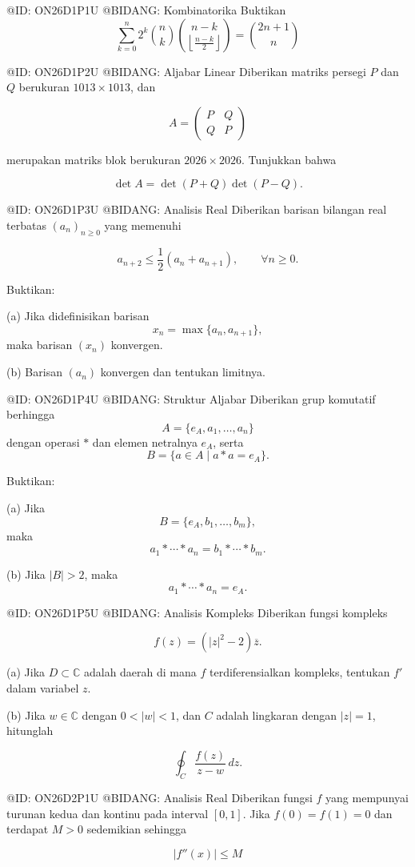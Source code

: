 @ID: ON26D1P1U
@BIDANG: Kombinatorika
Buktikan
$$
\sum_{k=0}^{n} 2^k \binom{n}{k} \binom{n-k}{\left\lfloor \frac{n-k}{2} \right\rfloor} = \binom{2n+1}{n}
$$

@ID: ON26D1P2U
@BIDANG: Aljabar Linear
Diberikan matriks persegi $P$ dan $Q$ berukuran $1013 \times 1013$, dan

$$
A=\begin{pmatrix}
P & Q\\
Q & P
\end{pmatrix}
$$

merupakan matriks blok berukuran $2026 \times 2026$. Tunjukkan bahwa

$$
\det A=\det(P+Q)\det(P-Q).
$$

@ID: ON26D1P3U
@BIDANG: Analisis Real
Diberikan barisan bilangan real terbatas $(a_n)_{n\ge0}$ yang memenuhi

$$
a_{n+2}\le\frac12(a_n+a_{n+1}),\qquad \forall n\ge0.
$$

Buktikan:

(a) Jika didefinisikan barisan
$$
x_n=\max\{a_n,a_{n+1}\},
$$
maka barisan $(x_n)$ konvergen.

(b) Barisan $(a_n)$ konvergen dan tentukan limitnya.

@ID: ON26D1P4U
@BIDANG: Struktur Aljabar
Diberikan grup komutatif berhingga
$$
A=\{e_A,a_1,\dots,a_n\}
$$
dengan operasi $*$ dan elemen netralnya $e_A$, serta
$$
B=\{a\in A\mid a*a=e_A\}.
$$

Buktikan:

(a) Jika
$$
B=\{e_A,b_1,\dots,b_m\},
$$
maka
$$
a_1*\cdots*a_n=b_1*\cdots*b_m.
$$

(b) Jika $|B|>2$, maka
$$
a_1*\cdots*a_n=e_A.
$$

@ID: ON26D1P5U
@BIDANG: Analisis Kompleks
Diberikan fungsi kompleks

$$
f(z)=(|z|^2-2)\overline z.
$$

(a) Jika $D\subset\mathbb C$ adalah daerah di mana $f$ terdiferensialkan kompleks, tentukan $f'$ dalam variabel $z$.

(b) Jika $w\in\mathbb C$ dengan $0<|w|<1$, dan $C$ adalah lingkaran dengan $|z|=1$, hitunglah

$$
\oint_C\frac{f(z)}{z-w}\,dz.
$$

@ID: ON26D2P1U
@BIDANG: Analisis Real
Diberikan fungsi $f$ yang mempunyai turunan kedua dan kontinu pada interval $[0,1]$. Jika $f(0)=f(1)=0$ dan terdapat $M>0$ sedemikian sehingga

$$
|f''(x)|\le M
$$

